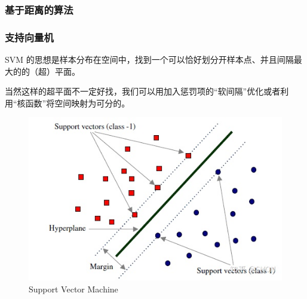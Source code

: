 \subsubsection{基于距离的算法}
\begin{frame}
    \frametitle{支持向量机}
    SVM 的思想是样本分布在空间中，找到一个可以恰好划分开样本点、并且间隔最大的的（超）平面。

    当然这样的超平面不一定好找，我们可以用加入惩罚项的“软间隔”优化或者利用“核函数”将空间映射为可分的。

    \begin{center}
        \begin{figure}
            \includegraphics[width=0.6\linewidth]{../lib/SVM.jpeg}
            \caption{Support Vector Machine}
            \label{SVM}
        \end{figure}
    \end{center}
\end{frame}
